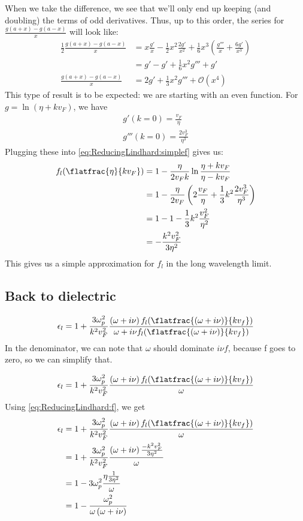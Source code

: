 \documentclass[../../main.tex]{subfiles}
\newcommand{\vf}{v_F}
\begin{document}
When we take the difference, we see that we'll only end up keeping (and doubling) the terms of odd derivatives. Thus, up to this order, the series for $\frac{g(a + x) - g(a - x)}{x}$ will look like:
\begin{align}
	\frac12 \frac{g(a + x) - g(a - x)}{x} &= x \frac{g'}{x} - \frac12 x^2 \frac{2 g'}{x^2} + \frac16 x^3 \left( \frac{g'''}{x} + \frac{6 g'}{x^3} \right) \\
	&= g' - g' + \frac16 x^2 g''' + g' \\
	\frac{g(a + x) - g(a - x)}{x} &= 2g' + \frac13 x^2 g''' + \mathcal{O}(x^4)
\end{align}
This type of result is to be expected: we are starting with an even function. For $g = \ln(\eta + k \vf)$, we have
\begin{align}
	g'(k = 0) = \frac{\vf}{\eta} \\
	g'''(k = 0) = \frac{2 \vf^3}{\eta^3}
\end{align}
Plugging these into \eqref{eq:ReducingLindhard:simplef} gives us:
\begin{align}
	f_l(\flatfrac{\eta}{k \vf}) &= 1 - \frac{\eta}{2 \vf k} \ln\frac{\eta + k \vf}{\eta - k\vf} \\
	&= 1- \frac{\eta}{2\vf} \left( 2 \frac{\vf}{\eta} + \frac13 k^2 \frac{2 \vf^3}{\eta^3} \right) \\
	&= 1 - 1 - \frac13 k^2 \frac{\vf^2}{\eta^2}	\\
	&= - \frac{k^2 \vf^2}{3 \eta^2} \label{eq:ReducingLindhard:f}
\end{align}
This gives us a simple approximation for $f_l$ in the long wavelength limit.

\subsection{Back to dielectric}
\begin{equation} \label{eq:ReducingLindhard:EpsWithF} 
 \epsilon_l = 1 + \frac{3 \omega_p^2}{k^2 v_F^2} \frac{\left(\omega + i \nu \right) f_l(\flatfrac{(\omega + i \nu)}{k v_f})}{\omega + i \nu f_l(\flatfrac{(\omega + i \nu)}{k v_f})}
\end{equation}
In the denominator, we can note that $\omega$ should dominate $i \nu f$, because f goes to zero, so we can simplify that. 

\begin{equation}
	 \epsilon_l = 1 + \frac{3 \omega_p^2}{k^2 v_F^2} \frac{\left(\omega + i \nu \right) f_l(\flatfrac{(\omega + i \nu)}{k v_f})}{\omega}
\end{equation}
Using \eqref{eq:ReducingLindhard:f}, we get
\begin{align}
	\epsilon_l &= 1 + \frac{3 \omega_p^2}{k^2 v_F^2} \frac{\left(\omega + i \nu \right) f_l(\flatfrac{(\omega + i \nu)}{k v_f})}{\omega} \\
	&= 1 + \frac{3 \omega_p^2}{k^2 v_F^2} \frac{\left(\omega + i \nu \right) \frac{-k^2 \vf^2}{3 \eta^2}}{\omega} \\
	&= 1 - 3 \omega_p^2 \frac{\eta \frac{1}{ 3\eta^2}}{\omega} \\
	&= 1 - \frac{ \omega_p^2}{\omega \left( \omega + i \nu \right)}
\end{align}
\end{document}
